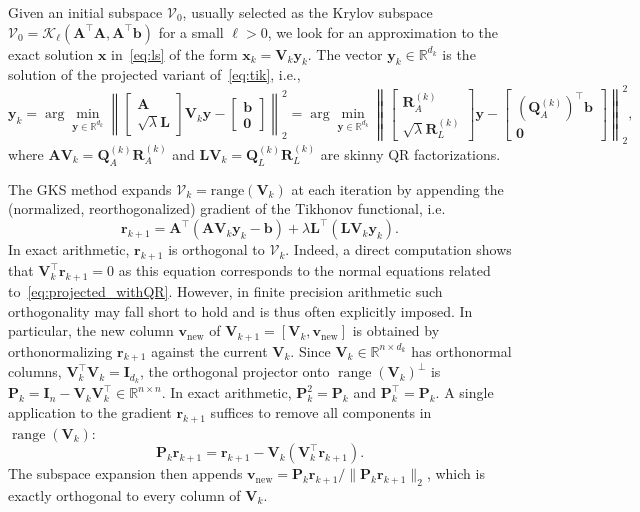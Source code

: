 \documentclass[%
  a4paper,
  onecolumn,
  colorlinks,
]{preprint}
\theoremstyle{plain}
\theoremstyle{definition}
\newcommand{\R}{\ensuremath{\mathbb{R}}}
\newcommand{\range}{\operatorname{range}}
\newcommand{\Kry}{\mathcal{K}}          %
\newcommand{\bA}{\ensuremath{\boldsymbol{A}}}
\newcommand{\bI}{\ensuremath{\boldsymbol{I}}}
\newcommand{\bL}{\ensuremath{\boldsymbol{L}}}
\newcommand{\bP}{\ensuremath{\boldsymbol{P}}}
\newcommand{\bQ}{\ensuremath{\boldsymbol{Q}}}
\newcommand{\bR}{\ensuremath{\boldsymbol{R}}}
\newcommand{\bV}{\ensuremath{\boldsymbol{V}}}
\newcommand{\bb}{\mathbf{b}}
\newcommand{\br}{\mathbf{r}}
\newcommand{\by}{\mathbf{y}}
\newcommand{\bx}{\mathbf{x}}
\newcommand{\bv}{\mathbf{v}}
\newcommand{\vnew}{\bv_{\mathrm{new}}}
\begin{document}
Given an initial subspace $\mathcal{V}_0$, usually selected as the Krylov subspace $\mathcal{V}_0=\Kry_\ell(\bA^\top\bA, \bA^\top\bb)$ for a small $\ell>0$, we look for an approximation to the exact solution $\bx$ in~\eqref{eq:ls} of the form $\bx_k= \bV_{k}\by_k$. The vector $\by_k\in\mathbb{R}^{d_k}$ is the solution of the projected variant of~\eqref{eq:tik}, i.e., 
\begin{equation}\label{eq:projected_withQR}
  \by_k =\arg\min_{\by\in\R^{d_k}}
  \left\|
  \begin{bmatrix}\bA\\
  \sqrt{\lambda}\bL\end{bmatrix}\bV_{k}\by
  -\begin{bmatrix}\bb\\\mathbf{0}\end{bmatrix}
  \right\|_2^2= \arg\min_{\by\in\R^{d_k}}
  \left\|
  \begin{bmatrix}\bR_A^{(k)}\\\sqrt{\lambda}\bR_L^{(k)}\end{bmatrix}\by
  -\begin{bmatrix}(\bQ_A^{(k)})^\top\bb\\\mathbf{0}\end{bmatrix}
  \right\|_2^2,
\end{equation}
where $\bA\bV_{k} = \bQ_A^{(k)}\bR_A^{(k)}$ and $\bL\bV_{k} = \bQ_L^{(k)}\bR_L^{(k)}$ are skinny QR factorizations.

The GKS method expands $\mathcal{V}_k=\text{range}(\bV_{k})$ at each iteration by appending the
(normalized, reorthogonalized) gradient of the Tikhonov functional, i.e.
\begin{equation}\label{eq: gradient}
  \br_{k+1} = \bA^\top(\bA\bV_{k}\by_k - \bb)
         + \lambda\bL^\top(\bL\bV_{k}\by_k).
\end{equation}
In exact arithmetic, $\br_{k+1}$ is orthogonal to $\mathcal{V}_k$. Indeed, a direct computation shows that $\bV_k^\top\br_{k+1}=0$ as this equation corresponds to the normal equations related to~\eqref{eq:projected_withQR}. However, in finite precision arithmetic such orthogonality may fall short to hold and is thus often explicitly imposed. 
In particular, the new column $\vnew$ of $\bV_{{k+1}}=[\bV_{k},\vnew]$
is obtained by orthonormalizing $\br_{k+1}$ against
the current $\bV_{k}$.
Since $\bV_k \in \R^{n \times d_k}$ has orthonormal columns,
$\bV_k^\top \bV_k = \bI_{d_k}$, the orthogonal projector onto
$\range(\bV_k)^\perp$ is
$\bP_k = \bI_n - \bV_k\bV_k^\top \in \R^{n \times n}$.
In exact arithmetic, $\bP_k^2 = \bP_k$ and $\bP_k^\top = \bP_k$.
A single application to the gradient $\br_{k+1}$ suffices to remove all components
in $\range(\bV_k)$:
\begin{equation}\label{eq:single_mgs}
  \bP_k\br_{k+1} = \br_{k+1} - \bV_k(\bV_k^\top\br_{k+1}).
\end{equation}
The subspace expansion then appends
$\vnew = \bP_k\br_{k+1} / \|\bP_k\br_{k+1}\|_2$,
which is exactly orthogonal to every column of $\bV_k$.
\end{document}
